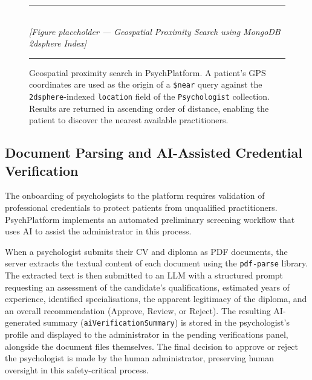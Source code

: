 \begin{figure}[H]
  \centering
  \rule{0.85\textwidth}{0.4pt}\\[6pt]
  {\small\itshape [Figure placeholder — Geospatial Proximity Search using MongoDB 2dsphere Index]}
  \rule{0.85\textwidth}{0.4pt}
  \caption{Geospatial proximity search in PsychPlatform. A patient's GPS
           coordinates are used as the origin of a \texttt{\$near} query against
           the \texttt{2dsphere}-indexed \texttt{location} field of the
           \texttt{Psychologist} collection. Results are returned in ascending
           order of distance, enabling the patient to discover the nearest
           available practitioners.}
  \label{fig:geospatial}
\end{figure}

\subsection{Document Parsing and AI-Assisted Credential Verification}
\label{subsec:cred}

The onboarding of psychologists to the platform requires validation of
professional credentials to protect patients from unqualified practitioners.
PsychPlatform implements an automated preliminary screening workflow that uses
AI to assist the administrator in this process.

When a psychologist submits their CV and diploma as PDF documents, the server
extracts the textual content of each document using the \texttt{pdf-parse}
library. The extracted text is then submitted to an LLM with a structured prompt
requesting an assessment of the candidate's qualifications, estimated years of
experience, identified specialisations, the apparent legitimacy of the diploma,
and an overall recommendation (Approve, Review, or Reject). The resulting
AI-generated summary (\texttt{aiVerificationSummary}) is stored in the
psychologist's profile and displayed to the administrator in the pending
verifications panel, alongside the document files themselves. The final decision
to approve or reject the psychologist is made by the human administrator,
preserving human oversight in this safety-critical process.

